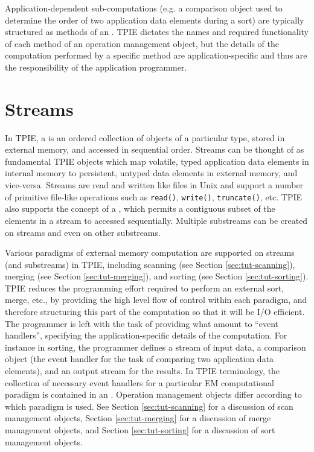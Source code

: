 Application-dependent sub-computations (e.g. a comparison object used
to determine the order of two application data elements during a sort)
are typically structured as methods of an . TPIE dictates the names and required functionality of each
method of an operation management object, but the details of the
computation performed by a specific method are application-specific
and thus are the responsibility of the application programmer.


\section{Streams}

In  TPIE, a  is an ordered collection of
objects of a particular type, stored in external memory, and accessed
in sequential order. Streams can be thought of as fundamental TPIE
objects which map volatile, typed application data elements in
internal memory to persistent, untyped data elements in external
memory, and vice-versa.  Streams are read and written like files in
Unix and support a number of primitive file-like operations such as
\lstinline|read()|, \lstinline|write()|, \lstinline|truncate()|, etc.
TPIE also supports the concept of a , which
permits a contiguous subset of the elements in a stream to
accessed sequentially. Multiple substreams can be created on
streams and even on other substreams. 

Various paradigms of external memory computation are supported on
streams (and substreams) in TPIE, including scanning (see Section
\ref{sec:tut-scanning}), merging (see Section \ref{sec:tut-merging}),
and sorting (see Section \ref{sec:tut-sorting}). TPIE reduces the
programming effort required to perform an external sort, merge, etc.,
by providing the high level flow of control within each paradigm, and
therefore structuring this part of the computation so that it will be
I/O efficient. The programmer is left with the task of providing what
amount to ``event handlers'', specifying the application-specific
details of the computation. For instance in sorting, the programmer
defines a stream of input data, a comparison object (the event handler
for the task of comparing two application data elements), and an
output stream for the results. In TPIE terminology, the collection of
necessary event handlers for a particular EM computational paradigm is
contained in an . Operation
management objects differ according to which paradigm is used.  See
Section \ref{sec:tut-scanning} for a discussion of scan management
objects, Section \ref{sec:tut-merging} for a discussion of merge
management objects, and Section \ref{sec:tut-sorting} for a discussion
of sort management objects.

